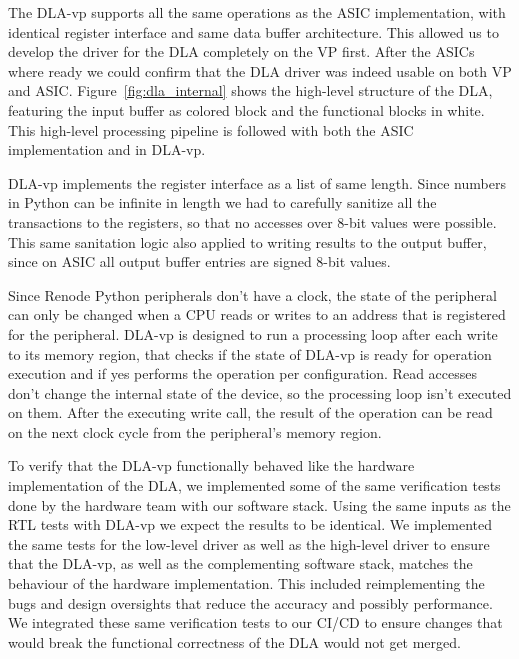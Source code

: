 \documentclass[12pt,a4paper,english
]{tunithesis}
\begin{document}
The DLA-vp supports all the same operations as the ASIC implementation, with identical register interface and same data buffer architecture. This allowed us to develop the driver for the DLA completely on the VP first. After the ASICs where ready we could confirm that the DLA driver was indeed usable on both VP and ASIC. Figure~\ref{fig:dla_internal} shows the high-level structure of the DLA, featuring the input buffer as colored block and the functional blocks in white. This high-level processing pipeline is followed with both the ASIC implementation and in DLA-vp.

DLA-vp implements the register interface as a list of same length. Since numbers in Python can be infinite in length we had to carefully sanitize all the transactions to the registers, so that no accesses over 8-bit values were possible. This same sanitation logic also applied to writing results to the output buffer, since on ASIC all output buffer entries are signed 8-bit values.

Since Renode Python peripherals don't have a clock, the state of the peripheral can only be changed when a CPU reads or writes to an address that is registered for the peripheral. DLA-vp is designed to run a processing loop after each write to its memory region, that checks if the state of DLA-vp is ready for operation execution and if yes performs the operation per configuration. Read accesses don't change the internal state of the device, so the processing loop isn't executed on them. After the executing write call, the result of the operation can be read on the next clock cycle from the peripheral's memory region.

To verify that the DLA-vp functionally behaved like the hardware implementation of the DLA, we implemented some of the same verification tests done by the hardware team with our software stack. Using the same inputs as the RTL tests with DLA-vp we expect the results to be identical. We implemented the same tests for the low-level driver as well as the high-level driver to ensure that the DLA-vp, as well as the complementing software stack, matches the behaviour of the hardware implementation. This included reimplementing the bugs and design oversights that reduce the accuracy and possibly performance. We integrated these same verification tests to our CI/CD to ensure changes that would break the functional correctness of the DLA would not get merged.
\end{document}
